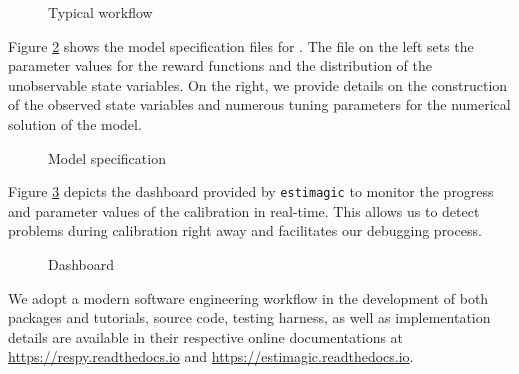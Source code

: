 \begin{figure}[ht!]\centering
\caption{Typical workflow}\label{Typical workflow}

\end{figure}\FloatBarrier

\noindent Figure \ref{Model specification} shows the model specification files for \citet{Keane.1994}. The file on the left sets the parameter values for the reward functions and the distribution of the unobservable state variables. On the right, we provide details on the construction of the observed state variables and numerous tuning parameters for the numerical solution of the model.

\begin{figure}[h!]\centering
\caption{Model specification}\label{Model specification}
\hspace{0.3cm}
\end{figure}\FloatBarrier

\noindent Figure \ref{Dashboard} depicts the dashboard provided by \verb+estimagic+ to monitor the progress and parameter values of the calibration in real-time. This allows us to detect problems during calibration right away and facilitates our debugging process.

\begin{figure}[h!]\centering
\caption{Dashboard}\label{Dashboard}
\end{figure}\FloatBarrier

\noindent We adopt a modern software engineering workflow in the development of both packages and tutorials, source code, testing harness, as well as implementation details are available in their respective online documentations at \url{https://respy.readthedocs.io} and \url{https://estimagic.readthedocs.io}.
